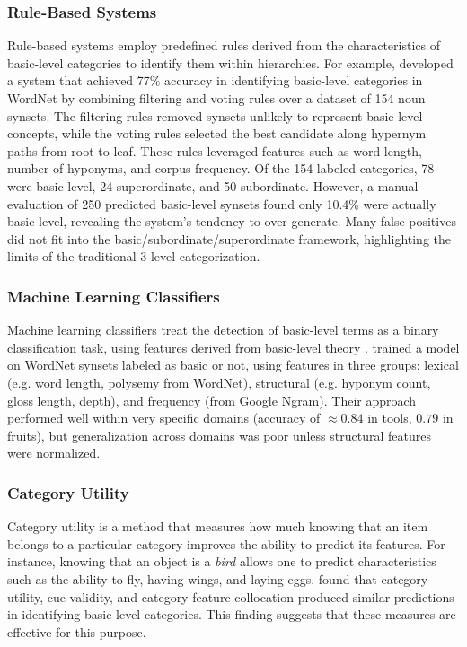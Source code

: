 \documentclass[preprint,12pt,authoryear]{elsarticle}
\begin{document}
\subsubsection{Rule-Based Systems}

Rule-based systems employ predefined rules derived from the characteristics of basic-level categories to identify them within hierarchies. For example, \citet{mills_automatic_2018} developed a system that achieved 77\% accuracy in identifying basic-level categories in WordNet by combining filtering and voting rules over a dataset of 154 noun synsets. The filtering rules removed synsets unlikely to represent basic-level concepts, while the voting rules selected the best candidate along hypernym paths from root to leaf. These rules leveraged features such as word length, number of hyponyms, and corpus frequency. Of the 154 labeled categories, 78 were basic-level, 24 superordinate, and 50 subordinate. However, a manual evaluation of 250 predicted basic-level synsets found only 10.4\% were actually basic-level, revealing the system's tendency to over-generate. Many false positives did not fit into the basic/subordinate/superordinate framework, highlighting the limits of the traditional 3-level categorization.

\subsubsection{Machine Learning Classifiers}

Machine learning classifiers treat the detection of basic-level terms as a binary classification task, using features derived from basic-level theory \cite{rosch_basic_1976}. \citet{hollink_predicting_2020} trained a model on WordNet synsets labeled as basic or not, using features in three groups: lexical (e.g. word length, polysemy from WordNet), structural (e.g. hyponym count, gloss length, depth), and frequency (from Google Ngram). Their approach performed well within very specific domains (accuracy of $\approx 0.84$ in tools, $0.79$ in fruits), but generalization across domains was poor unless structural features were normalized.

\subsubsection{Category Utility}

Category utility is a method that measures how much knowing that an item belongs to a particular category improves the ability to predict its features. For instance, knowing that an object is a \textit{bird} allows one to predict characteristics such as the ability to fly, having wings, and laying eggs.\citet{belohlavek_basic_2020} found that category utility, cue validity, and category-feature collocation produced similar predictions in identifying basic-level categories. This finding suggests that these measures are effective for this purpose.
\end{document}

